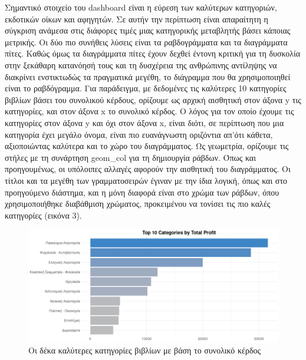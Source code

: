 \documentclass[greek, 12pt]{article}
\begin{document}
Σημαντικό στοιχείο του dashboard είναι η εύρεση των καλύτερων κατηγοριών, εκδοτικών οίκων και αφηγητών. Σε αυτήν την περίπτωση είναι απαραίτητη η σύγκριση ανάμεσα στις διάφορες τιμές μιας κατηγορικής μεταβλητής βάσει κάποιας μετρικής. Οι δύο πιο συνήθεις λύσεις είναι τα ραβδογράμματα και τα διαγράμματα πίτες. Καθώς όμως τα διαγράμματα πίτες έχουν δεχθεί έντονη κριτική για τη δυσκολία στην ξεκάθαρη κατανόησή τους και τη δυσχέρεια της ανθρώπινης αντίληψης να διακρίνει ενστικτωδώς τα πραγματικά μεγέθη, το διάγραμμα που θα χρησιμοποιηθεί είναι το ραβδόγραμμα. Για παράδειγμα, με δεδομένες τις καλύτερες 10 κατηγορίες βιβλίων βάσει του συνολικού κέρδους, ορίζουμε ως αρχική αισθητική στον άξονα y τις κατηγορίες, και στον άξονα x το συνολικό κέρδος. Ο λόγος για τον οποίο έχουμε τις κατηγορίες στον άξονα y και όχι στον άξονα x, είναι διότι, σε περίπτωση που μια κατηγορία έχει μεγάλο όνομα, είναι πιο ευανάγνωστη οριζόντια απ’ότι κάθετα, αξιοποιώντας καλύτερα και το χώρο του διαγράμματος. Ως γεωμετρία, ορίζουμε τις στήλες με τη συνάρτηση geom\_col για τη δημιουργία ράβδων. Όπως και προηγουμένως, οι υπόλοιπες αλλαγές αφορούν την αισθητική του διαγράμματος. Οι τίτλοι και τα μεγέθη των γραμματοσειρών έγιναν με την ίδια λογική, όπως και στο προηγούμενο διάστημα, και η μόνη διαφορά είναι στο χρώμα των ράβδων, όπου χρησιμοποιήθηκε διαβάθμιση χρώματος, προκειμένου να τονίσει τις πιο καλές κατηγορίες (εικόνα 3).

\begin{figure}[h]
    \centering
    \includegraphics[width=\textwidth]{pictures/3_bar_graph.png}
    \caption{Οι δέκα καλύτερες κατηγορίες βιβλίων με βάση το συνολικό κέρδος}
    \label{fig:3}
\end{figure}
\end{document}
